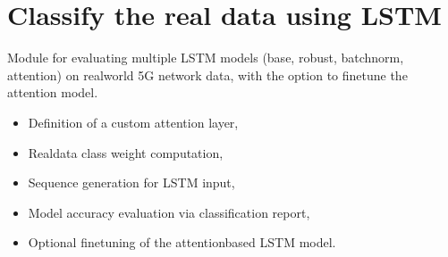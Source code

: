 \documentclass[letterpaper,10pt,english]{sphinxmanual}
\begin{document}
\chapter{Classify the real data using LSTM}
\label{\detokenize{lstm_results_real_data:module-lstm_results_real_data}}\label{\detokenize{lstm_results_real_data:classify-the-real-data-using-lstm}}\label{\detokenize{lstm_results_real_data::doc}}
\sphinxAtStartPar
Module for evaluating multiple LSTM models (base, robust, batchnorm, attention)
on real\sphinxhyphen{}world 5G network data, with the option to fine\sphinxhyphen{}tune the attention model.
\begin{description}
\begin{itemize}
\item {} 
\sphinxAtStartPar
Definition of a custom attention layer,

\item {} 
\sphinxAtStartPar
Real\sphinxhyphen{}data class weight computation,

\item {} 
\sphinxAtStartPar
Sequence generation for LSTM input,

\item {} 
\sphinxAtStartPar
Model accuracy evaluation via classification report,

\item {} 
\sphinxAtStartPar
Optional fine\sphinxhyphen{}tuning of the attention\sphinxhyphen{}based LSTM model.

\end{itemize}

\end{description}
\end{document}
